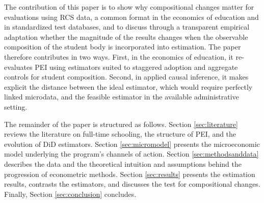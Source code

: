 The contribution of this paper is to show why compositional changes matter for evaluations using RCS data, a common format in the economics of education and in standardized test databases, and to discuss through a transparent empirical adaptation whether the magnitude of the results changes when the observable composition of the student body is incorporated into estimation. The paper therefore contributes in two ways. First, in the economics of education, it re-evaluates PEI using estimators suited to staggered adoption and aggregate controls for student composition. Second, in applied causal inference, it makes explicit the distance between the ideal estimator, which would require perfectly linked microdata, and the feasible estimator in the available administrative setting.

The remainder of the paper is structured as follows. Section \ref{sec:literature} reviews the literature on full-time schooling, the structure of PEI, and the evolution of DiD estimators. Section \ref{sec:micromodel} presents the microeconomic model underlying the program's channels of action. Section \ref{sec:methodsanddata} describes the data and the theoretical intuition and assumptions behind the progression of econometric methods. Section \ref{sec:results} presents the estimation results, contrasts the estimators, and discusses the test for compositional changes. Finally, Section \ref{sec:conclusion} concludes.
